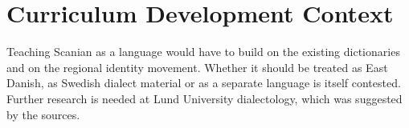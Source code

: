\documentclass[12pt]{article}
\begin{document}
\section{Curriculum Development Context}
Teaching Scanian as a language would have to build on the existing dictionaries and on the regional identity movement. Whether it should be treated as East Danish, as Swedish dialect material or as a separate language is itself contested. Further research is needed at Lund University dialectology, which was suggested by the sources.
\end{document}
